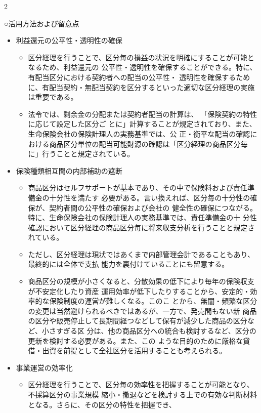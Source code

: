 2\documentclass[report,gutter=10mm,fore-edge=10mm,uplatex,dvipdfmx]{jlreq}
\begin{document}
\noindent ○活用方法および留意点

\begin{itemize}
 \item[] 利益還元の公平性・透明性の確保
\begin{itemize}
\item[] 区分経理を行うことで、区分毎の損益の状況を明確にすることが可能となるため、利益還元の
 公平性・透明性を確保することができる。特に、有配当区分における契約者への配当の公平性・
 透明性を確保するために、有配当契約・無配当契約を区分するといった適切な区分経理の実施
 は重要である。
\item[] 法令では、剰余金の分配または契約者配当の計算は、
 「保険契約の特性に応じて設定した区分ご
 とに」計算することが規定されており、また、生命保険会社の保険計理人の実務基準では、公
 正・衡平な配当の確認における商品区分単位の配当可能財源の確認は「区分経理の商品区分毎
 に」行うことと規定されている。
\end{itemize}
 \item[] 保険種類相互間の内部補助の遮断
\begin{itemize}
\item[] 商品区分はセルフサポートが基本であり、その中で保険料および責任準備金の十分性を満たす
 必要がある。言い換えれば、区分毎の十分性の確保が、契約者間の公平性の確保および会社の
 健全性の確保につながる。特に、生命保険会社の保険計理人の実務基準では、責任準備金の十
 分性確認において区分経理の商品区分毎に将来収支分析を行うことと規定されている。
\item[] ただし、区分経理は現状ではあくまで内部管理会計であることもあり、最終的には全体で支払
 能力を裏付けていることにも留意する。
\item[] 商品区分の規模が小さくなると、分散効果の低下により毎年の保険収支が不安定化したり資産
 運用効率が低下したりすることから、安定的・効率的な保険制度の運営が難しくなる。このこ
 とから、無闇・頻繁な区分の変更は当然避けられるべきではあるが、一方で、発売間もない新
 商品の区分や販売停止して長期間経つなどして保有が減少した商品の区分など、小さすぎる区
 分は、他の商品区分への統合も検討するなど、区分の更新を検討する必要がある。また、この
 ような目的のために厳格な貸借・出資を前提として全社区分を活用することも考えられる。
\end{itemize}
 \item[] 事業運営の効率化
\begin{itemize}
\item[] 区分経理を行うことで、区分毎の効率性を把握することが可能となり、不採算区分の事業規模
 縮小・撤退などを検討する上での有効な判断材料となる。さらに、その区分の特性を把握でき、

\end{itemize}
\end{itemize}
\end{document}
